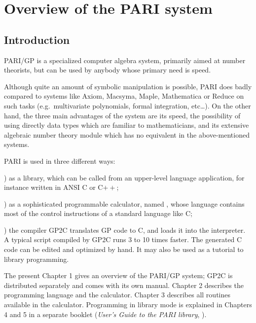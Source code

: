 %
%
\chapter{Overview of the PARI system}

\section{Introduction}

\noindent
PARI/GP is a specialized computer algebra system, primarily aimed at number
theorists, but can be used by anybody whose primary need is speed.

Although quite an amount of symbolic manipulation is possible, PARI does
badly compared to systems like Axiom, Macsyma, Maple, Mathematica or Reduce
on such tasks (e.g.~multivariate polynomials, formal integration, etc\dots).
On the other hand, the three main advantages of the system are its speed, the
possibility of using directly data types which are familiar to
mathematicians, and its extensive algebraic number theory module which has
no equivalent in the above-mentioned systems.

PARI is used in three different ways:

) as a library, which can be called from an upper-level language
application, for instance written in ANSI C or C$++$;

) as a sophisticated programmable calculator, named , whose
language  contains most of the control instructions of a standard
language like C;

) the compiler GP2C translates GP code to C, and loads it into the
 interpreter. A typical script compiled by GP2C runs 3 to 10 times
faster. The generated C code can be edited and optimized by hand. It
may also be used as a tutorial to library programming.

The present Chapter 1 gives an overview of the PARI/GP system; GP2C is
distributed separately and comes with its own manual. Chapter 2 describes the
 programming language and the  calculator. Chapter 3
describes all routines available in the calculator. Programming in library
mode is explained in Chapters 4 and 5 in a separate booklet (\emph{User's
Guide to the PARI library}, ).

